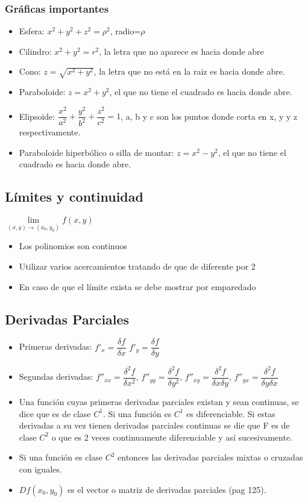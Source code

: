 \subsubsection{Gráficas importantes}
\begin{itemize}
	\item Esfera: $x^2+y^2+z^2=\rho^2$, radio=$\rho$
	\item Cilindro:  $x^2+y^2=r^2$, la letra que no aparece es hacia donde abre
	\item Cono: $ z=\sqrt{x^2+y^2}$, la letra que no está en la raiz es hacia donde abre.
	\item Paraboloide: $ z=x^2+y^2$, el que no tiene el cuadrado es hacia donde abre.
	\item Elipsoide: $\dfrac{x^2}{a^2}+\dfrac{y^2}{b^2}+\dfrac{z^2}{c^2}=1$, a, b y c son los puntos donde corta en x, y y z respectivamente.
	\item Paraboloide hiperbólico o silla de montar: $ z=x^2-y^2$, el que no tiene el cuadrado es hacia donde abre.
\end{itemize}

\subsection{Límites y continuidad}
$\lim\limits_{(x,y) \to (x_0,y_0)}f(x,y)$

\begin{itemize}
	\item Los polinomios son continuos
	\item Utilizar varios acercamientos tratando de que de diferente por 2
	\item En caso de que el límite exista se debe mostrar por emparedado
\end{itemize}

\subsection{Derivadas Parciales}
\begin{itemize}
	\item Primeras derivadas: $f'_x=\dfrac{\delta f}{\delta x}$ $f'_y=\dfrac{\delta f}{\delta y}$
	\item Segundas derivadas: $f''_{xx}=\dfrac{\delta^2 f}{\delta x^2}$, $f''_{yy}=\dfrac{\delta^2 f}{\delta y^2}$, $f''_{xy}=\dfrac{\delta^2 f}{\delta x\delta y}$, $f''_{yx}=\dfrac{\delta^2 f}{\delta y\delta x}$
	\item Una función cuyas primeras derivadas parciales existan y sean continuas, se dice que es de clase $C^1$. Si una función es $C^1$ es diferenciable. Si estas derivadas a su vez tienen derivadas parciales continuas se die que F es de clase $C^2$ o que es 2 veces continuamente diferenciable y así sucesivamente.
	\item Si una función es clase $C^2$ entonces las derivadas parciales mixtas o cruzadas con iguales.
	\item $Df(x_0,y_0)$ es el vector o matriz de derivadas parciales (pag 125).
\end{itemize}

